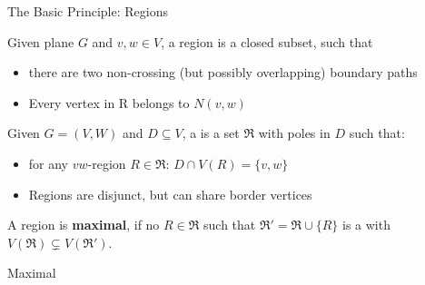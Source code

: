 \begin{frame}[c]{The Basic Principle: Regions}

    \begin{tcolorbox}[colback=TUMBlueLighter,title=Region (Simplified)]
        Given plane $G$ and $v,w \in V$, a region is a closed subset, such that
    \begin{itemize}
        \item there are two non-crossing (but possibly overlapping) boundary paths
        \item Every vertex in R belongs to $N(v,w)$
    \end{itemize}
    \end{tcolorbox}

    \begin{figure}[!ht]
    \end{figure}
\end{frame}

\begin{frame}[c]{\dreg}
    \begin{tcolorbox}[colback=TUMBlueLighter,title={\dreg\cite{Alber2004}}]
        Given $G = (V, W)$ and $D \subseteq V$, a \dreg is a set $\mathfrak{R}$ with poles in $D$ such that:
        \begin{itemize}
            \item for any $vw$-region $R \in \mathfrak{R}$: $D \cap V(R) = \{v, w\}$
            \item Regions are disjunct, but can share border vertices
        \end{itemize}
    \end{tcolorbox}
   \pause A region is \textbf{maximal}, if no $R \in \mathfrak{R}$ such that $\mathfrak{R}' = \mathfrak{R} \cup \{R\}$ is a \dreg with $V(\mathfrak{R})\subsetneq V(\mathfrak{R}')$.
\end{frame}

\begin{frame}[c]{Maximal \dreg}
    \begin{figure}[!ht]
    \end{figure}
\end{frame}

